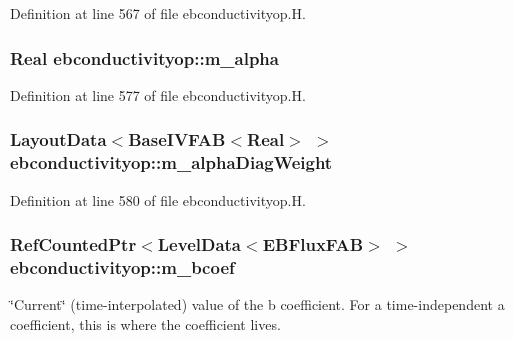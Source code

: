 Definition at line 567 of file ebconductivityop.\+H.

\subsubsection[{\texorpdfstring{m\+\_\+alpha}{m_alpha}}]{\setlength{\rightskip}{0pt plus 5cm}Real ebconductivityop\+::m\+\_\+alpha\hspace{0.3cm}{\ttfamily [protected]}}\hypertarget{classebconductivityop_a58cff16e5e8f875105be87e190e7b801}{}\label{classebconductivityop_a58cff16e5e8f875105be87e190e7b801}


Definition at line 577 of file ebconductivityop.\+H.

\subsubsection[{\texorpdfstring{m\+\_\+alpha\+Diag\+Weight}{m_alphaDiagWeight}}]{\setlength{\rightskip}{0pt plus 5cm}Layout\+Data$<$Base\+I\+V\+F\+AB$<$Real$>$ $>$ ebconductivityop\+::m\+\_\+alpha\+Diag\+Weight\hspace{0.3cm}{\ttfamily [protected]}}\hypertarget{classebconductivityop_a16d5374437099848d72dd60597596f04}{}\label{classebconductivityop_a16d5374437099848d72dd60597596f04}


Definition at line 580 of file ebconductivityop.\+H.

\subsubsection[{\texorpdfstring{m\+\_\+bcoef}{m_bcoef}}]{\setlength{\rightskip}{0pt plus 5cm}Ref\+Counted\+Ptr$<$Level\+Data$<$E\+B\+Flux\+F\+AB$>$ $>$ ebconductivityop\+::m\+\_\+bcoef\hspace{0.3cm}{\ttfamily [protected]}}\hypertarget{classebconductivityop_a93dc94bee7ac7e8010e5db24894463ea}{}\label{classebconductivityop_a93dc94bee7ac7e8010e5db24894463ea}
\char`\"{}\+Current\char`\"{} (time-\/interpolated) value of the b coefficient. For a time-\/independent a coefficient, this is where the coefficient lives. 

